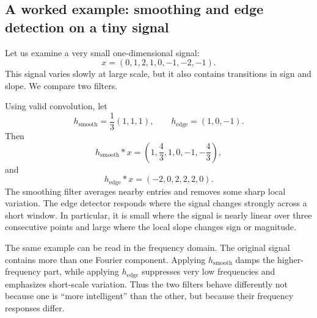 \subsection*{A worked example: smoothing and edge detection on a tiny signal}

Let us examine a very small one-dimensional signal:
\[
 x = (0,1,2,1,0,-1,-2,-1).
\]
This signal varies slowly at large scale, but it also contains transitions in sign and slope.
We compare two filters.

\begin{example}
Using valid convolution, let
\[
 h_{\mathrm{smooth}} = \frac{1}{3}(1,1,1),
 \qquad
 h_{\mathrm{edge}} = (1,0,-1).
\]
Then
\[
 h_{\mathrm{smooth}} * x
 = \left(1, \frac{4}{3}, 1, 0, -1, -\frac{4}{3}\right),
\]
and
\[
 h_{\mathrm{edge}} * x
 = (-2,0,2,2,2,0).
\]
The smoothing filter averages nearby entries and removes some sharp local variation.
The edge detector responds where the signal changes strongly across a short window.
In particular, it is small where the signal is nearly linear over three consecutive points and large where the local slope changes sign or magnitude.
\end{example}

\medskip

The same example can be read in the frequency domain.
The original signal contains more than one Fourier component.
Applying $h_{\mathrm{smooth}}$ damps the higher-frequency part, while applying $h_{\mathrm{edge}}$ suppresses very low frequencies and emphasizes short-scale variation.
Thus the two filters behave differently not because one is ``more intelligent'' than the other, but because their frequency responses differ.

